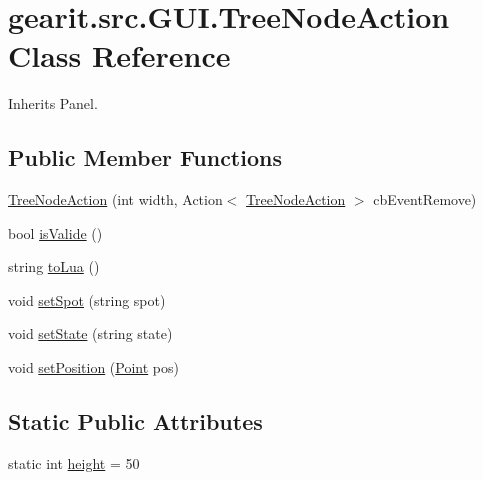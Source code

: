 \hypertarget{classgearit_1_1src_1_1_g_u_i_1_1_tree_node_action}{\section{gearit.\+src.\+G\+U\+I.\+Tree\+Node\+Action Class Reference}
\label{classgearit_1_1src_1_1_g_u_i_1_1_tree_node_action}
}


Inherits Panel.

\subsection*{Public Member Functions}
\begin{DoxyCompactItemize}
\item 
\hyperlink{classgearit_1_1src_1_1_g_u_i_1_1_tree_node_action_a08ac1ef2127ccdeb5b38d3db4ae47684}{Tree\+Node\+Action} (int width, Action$<$ \hyperlink{classgearit_1_1src_1_1_g_u_i_1_1_tree_node_action}{Tree\+Node\+Action} $>$ cb\+Event\+Remove)
\item 
bool \hyperlink{classgearit_1_1src_1_1_g_u_i_1_1_tree_node_action_a3b180f09ca1c8ef936cb3fc3fa902a84}{is\+Valide} ()
\item 
string \hyperlink{classgearit_1_1src_1_1_g_u_i_1_1_tree_node_action_aa0fa1375ce48aa6a436443c2b658c7b1}{to\+Lua} ()
\item 
void \hyperlink{classgearit_1_1src_1_1_g_u_i_1_1_tree_node_action_ade228a11fe2afa620d1e2708bff9f436}{set\+Spot} (string spot)
\item 
void \hyperlink{classgearit_1_1src_1_1_g_u_i_1_1_tree_node_action_ac75865cca86d050b9a0e3c61b05d5a2f}{set\+State} (string state)
\item 
void \hyperlink{classgearit_1_1src_1_1_g_u_i_1_1_tree_node_action_a2baa908d047823dd92c9319964f3fa77}{set\+Position} (\hyperlink{_seidel_decomposer_8cs_a2a603daa342d957bd27dd0b1eb38af15}{Point} pos)
\end{DoxyCompactItemize}
\subsection*{Static Public Attributes}
\begin{DoxyCompactItemize}
\item 
static int \hyperlink{classgearit_1_1src_1_1_g_u_i_1_1_tree_node_action_a6f4b7d8ff4e6d4707bff8f978903bab9}{height} = 50
\end{DoxyCompactItemize}


